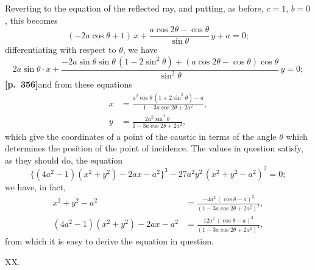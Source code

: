 \documentclass[11pt]{article}
\begin{document}
Reverting to the equation of the reflected ray, and putting, as before, $c = 1$, $b = 0$, this becomes
\[
(-2a\cos\theta + 1)\,x + \frac{a\cos 2\theta - \cos\theta}{\sin\theta}\,y + a = 0;
\]
differentiating with respect to $\theta$, we have
\[
2a\sin\theta\cdot x + \frac{-2a\sin\theta\sin\theta\,(1 - 2\sin^{2}\theta) + (a\cos 2\theta - \cos\theta)\cos\theta}{\sin^{2}\theta}\,y = 0;
\]
\noindent\textbf{[p.~356]}\quad and from these equations
\begin{align*}
x &= \frac{a^{2}\cos\theta\,(1 + 2\sin^{2}\theta) - a}{1 - 3a\cos 2\theta + 2a^{2}},\\
y &= \frac{2a^{2}\sin^{3}\theta}{1 - 3a\cos 2\theta + 2a^{2}},
\end{align*}
which give the coordinates of a point of the caustic in terms of the angle $\theta$ which determines the position of the point of incidence. The values in question satisfy, as they should do, the equation
\[
\bigl\{(4a^{2}-1)(x^{2}+y^{2}) - 2ax - a^{2}\bigr\}^{3} - 27a^{2}y^{2}\,(x^{2}+y^{2} - a^{2})^{2} = 0;
\]
we have, in fact,
\begin{align*}
x^{2} + y^{2} - a^{2} &= \frac{-4a^{2}\,(\cos\theta - a)^{2}}{(1 - 3a\cos 2\theta + 2a^{2})^{2}},\\
(4a^{2}-1)(x^{2}+y^{2}) - 2ax - a^{2} &= \frac{12a^{2}\,(\cos\theta - a)^{2}}{(1 - 3a\cos 2\theta + 2a^{2})^{2}},
\end{align*}
from which it is easy to derive the equation in question.

\medskip
\begin{center}XX.\end{center}
\end{document}
